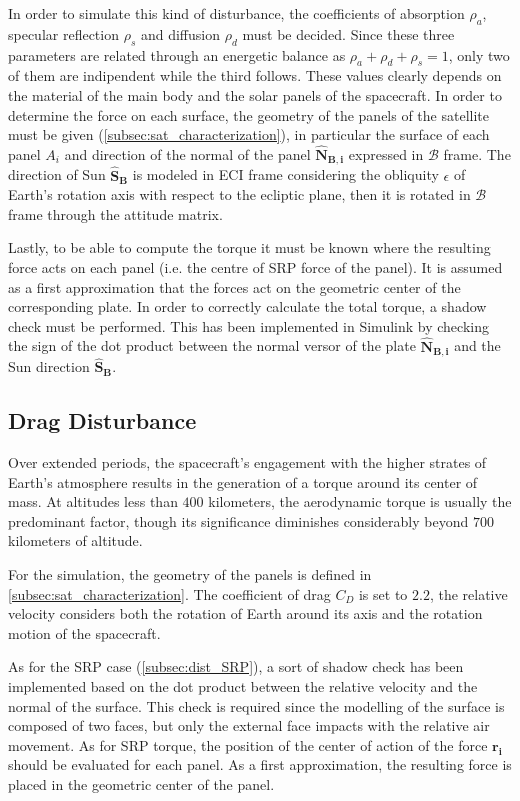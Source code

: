 In order to simulate this kind of disturbance, the coefficients of absorption $\rho_a$, specular reflection $\rho_s$ and diffusion $\rho_d$ must be decided. Since these three parameters are related through an energetic balance as $\rho_a + \rho_d + \rho_s = 1$, only two of them are indipendent while the third follows. These values clearly depends on the material of the main body and the solar panels of the spacecraft.
In order to determine the force on each surface, the geometry of the panels of the satellite must be given (\autoref{subsec:sat_characterization}), in particular the surface of each panel $A_i$ and direction of the normal of the panel $\boldsymbol{\hat{N}_{B,i}}$ expressed in $\mathcal{B}$ frame.
The direction of Sun $\boldsymbol{\hat{S}_B}$ is modeled in ECI frame considering the obliquity $\epsilon$ of Earth's rotation axis with respect to the ecliptic plane, then it is rotated in $\mathcal{B}$ frame through the attitude matrix.

Lastly, to be able to compute the torque it must be known where the resulting force acts on each panel (i.e. the centre of SRP force of the panel). It is assumed as a first approximation that the forces act on the geometric center of the corresponding plate. In order to correctly calculate the total torque, a shadow check must be performed. This has been implemented in Simulink by checking the sign of the dot product between the normal versor of the plate $\boldsymbol{\hat{N}_{B,i}}$ and the Sun direction $\boldsymbol{\hat{S}_B}$.


\subsection{Drag Disturbance}
\label{subsec:dist_drag}

Over extended periods, the spacecraft's engagement with the higher strates of Earth's atmosphere results in the generation of a torque around its center of mass. At altitudes less than $400$ kilometers, the aerodynamic torque is usually the predominant factor, though its significance diminishes considerably beyond $700$ kilometers of altitude.

For the simulation, the geometry of the panels is defined in \autoref{subsec:sat_characterization}. The coefficient of drag $C_D$ is set to $2.2$, the relative velocity considers both the rotation of Earth around its axis and the rotation motion of the spacecraft.

As for the SRP case (\autoref{subsec:dist_SRP}), a sort of shadow check has been implemented based on the dot product between the relative velocity and the normal of the surface. This check is required since the modelling of the surface is composed of two faces, but only the external face impacts with the relative air movement.
As for SRP torque, the position of the center of action of the force $\boldsymbol{r_i}$ should be evaluated for each panel. As a first approximation, the resulting force is placed in the geometric center of the panel.

